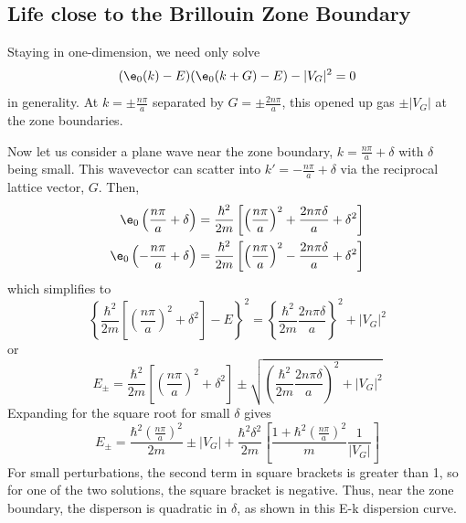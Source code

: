 \documentclass[a4paper, 11pt, normalem]{report}
\begin{document}
\chapter{}
\section{Life close to the Brillouin Zone Boundary}
Staying in one-dimension, we need only solve
\begin{equation}
    (\e_0(k) - E)(\e_0(k+G) - E) - |V_G|^2 = 0 
\end{equation}
in generality.
At $k = \pm\frac{n\pi}{a}$ separated by $G= \pm \frac{2n\pi}{a}$, this opened up gas $\pm|V_G|$ at the zone boundaries.

Now let us consider a plane wave near the zone boundary, $k = \frac{n\pi}{a} + \delta$ with $\delta$ being small. 
This wavevector can scatter into $k' = -\frac{n\pi}{a} + \delta$ via the reciprocal lattice vector, $G$.
Then, 
\begin{align}
    \e_0\left(\frac{n\pi}{a}+\delta\right) &= \frac{\hbar^2}{2m}\left[\left(\frac{n\pi}{a}\right)^2 + \frac{2n\pi\delta}{a} + \delta^2\right] \\
    \e_0\left(-\frac{n\pi}{a}+\delta\right) &= \frac{\hbar^2}{2m}\left[\left(\frac{n\pi}{a}\right)^2 - \frac{2n\pi\delta}{a} + \delta^2\right]
\end{align}
which simplifies to 
\begin{equation}
    \left\{\frac{\hbar^2}{2m}\left[\left(\frac{n\pi}{a}\right)^2 + \delta^2\right] - E\right\}^2 = \left\{\frac{\hbar^2}{2m}\frac{2n\pi\delta}{a}\right\}^2 + |V_G|^2
\end{equation}
or 
\begin{equation}
    E_\pm = \frac{\hbar^2}{2m}\left[\left(\frac{n\pi}{a}\right)^2 + \delta^2\right] \pm \sqrt{\left(\frac{\hbar^2}{2m}\frac{2n\pi\delta}{a}\right)^2+|V_G|^2}
\end{equation}
Expanding for the square root for small $\delta$ gives
\begin{equation}
    E_\pm = \frac{\hbar^2\left(\frac{n\pi}{a}\right)^2}{2m} \pm |V_G| + \frac{\hbar^2\delta^2}{2m}\left[\frac{1+\hbar^2\left(\frac{n\pi}{a}\right)^2}{m}\frac{1}{|V_G|}\right]
\end{equation}
For small perturbations, the second term in square brackets is greater than 1, so for one of the two solutions, the square bracket is negative.
Thus, near the zone boundary, the disperson is quadratic in $\delta$, as shown in this E-k dispersion curve.
\end{document}
